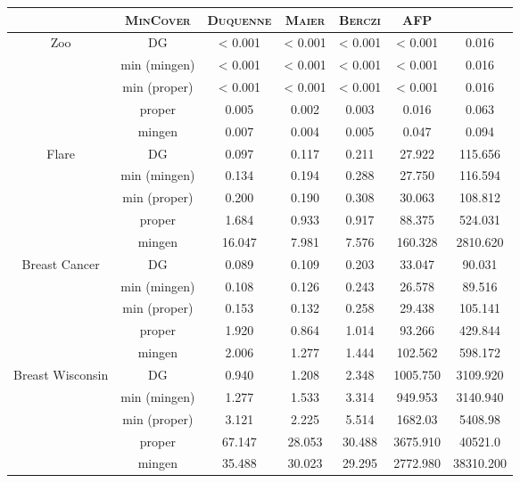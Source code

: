 \begin{table}[H]
	\centering
	\begin{tabular}{| c | c || c | c | c | c | c |}
		\hline \rowcolor{clouds}
		\multicolumn{2}{c}{$\I$} & \textsc{MinCover} & \textsc{Duquenne} & \textsc{Maier} & \textsc{Berczi} & \textsc{AFP} \\ \hline
		
		\multirow{5}{*}{Zoo}
		& DG           & < 0.001 & < 0.001 & < 0.001 & < 0.001 & 0.016 \\
		& min (mingen) & < 0.001 & < 0.001 & < 0.001 & < 0.001 & 0.016 \\
		& min (proper) & < 0.001 & < 0.001 & < 0.001 & < 0.001 & 0.016 \\
		& proper       & 0.005   & 0.002   & 0.003   & 0.016   & 0.063 \\
		& mingen       & 0.007   & 0.004   & 0.005   & 0.047   & 0.094 \\ \hline
		
		\multirow{5}{*}{Flare}
		& DG           & 0.097 & 0.117 & 0.211 & 27.922 & 115.656 \\
		& min (mingen) & 0.134 & 0.194 & 0.288 & 27.750 & 116.594 \\
		& min (proper) & 0.200 & 0.190 & 0.308 & 30.063 & 108.812 \\
		& proper       & 1.684 & 0.933 & 0.917 & 88.375 & 524.031 \\
		& mingen       & 16.047 & 7.981 & 7.576 & 160.328 & 2810.620 \\ \hline
		
		\multirow{5}{*}{Breast Cancer}
		& DG           & 0.089 & 0.109 & 0.203 & 33.047 & 90.031 \\
		& min (mingen) & 0.108 & 0.126 & 0.243 & 26.578 & 89.516 \\
		& min (proper) & 0.153 & 0.132 & 0.258 & 29.438 & 105.141 \\
		& proper       & 1.920 & 0.864 & 1.014 & 93.266 & 429.844 \\
		& mingen       & 2.006 & 1.277 & 1.444 & 102.562 & 598.172 \\ \hline
		
		\multirow{5}{*}{Breast Wisconsin} 
		& DG           & 0.940 & 1.208 & 2.348 & 1005.750 & 3109.920 \\
		& min (mingen) & 1.277 & 1.533 & 3.314 & 949.953 & 3140.940 \\
		& min (proper) & 3.121 & 2.225 & 5.514 & 1682.03 & 5408.98 \\
		& proper       & 67.147 & 28.053 & 30.488 & 3675.910 & 40521.0 \\
		& mingen       & 35.488 & 30.023 & 29.295 & 2772.980 & 38310.200 \\ \hline
		

\end{tabular}
\end{table}
